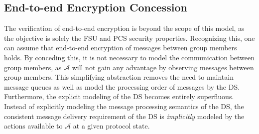 \documentclass[runningheads]{llncs}
\newcommand{\Abrev}[1]{\gls{#1}}
\newcommand{\Adversary}{\ensuremath{\mathcal{A}}\xspace}
\newcommand{\SetNote}[1]{\ensuremath{\left\{\;#1\;\right\}}\xspace}
\begin{document}


\subsection{End-to-end Encryption Concession}

The verification of end-to-end encryption is beyond the scope of this model, as the objective is solely the \Abrev{FSU} and \Abrev{PCS} security properties.
Recognizing this, one can assume that end-to-end encryption of messages between group members holds.
By conceding this, it is not necessary to model the communication between group members, as \Adversary will not gain any advantage by observing messages between group members.
This simplifying abstraction removes the need to maintain message queues as well as model the processing order of messages by the \Abrev{DS}.
Furthermore, the explicit modeling of the \Abrev{DS} becomes entirely superfluous.
Instead of explicitly modeling the message processing semantics of the \Abrev{DS}, the consistent message delivery requirement  of the \Abrev{DS} is \emph{implicitly} modeled by the actions available to \Adversary at a given protocol state.
\end{document}
